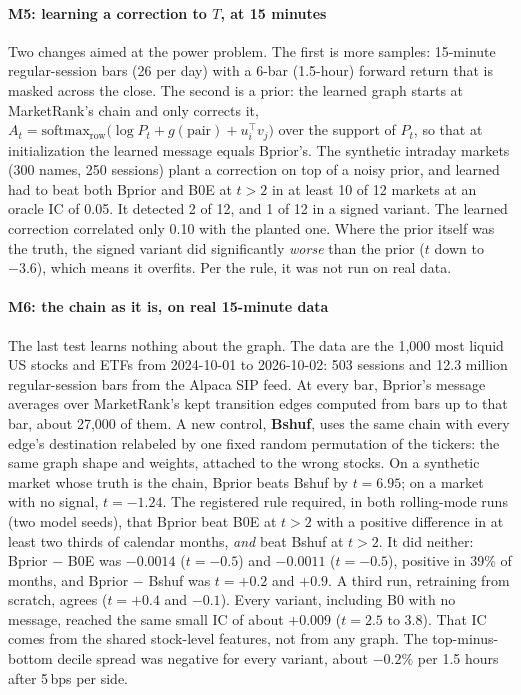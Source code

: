 \documentclass[preprint,3p,twocolumn]{elsarticle}
\newcommand{\MR}{MarketRank}
\begin{document}
\paragraph{M5: learning a correction to $T$, at 15 minutes} Two changes aimed at the power problem. The first is more samples: 15-minute regular-session bars (26 per day) with a 6-bar (1.5-hour) forward return that is masked across the close. The second is a prior: the learned graph starts at \MR's chain and only corrects it, $A_t=\mathrm{softmax}_{\text{row}}\bigl(\log P_t+g(\text{pair})+u_i^\top v_j\bigr)$ over the support of $P_t$, so that at initialization the learned message equals Bprior's. The synthetic intraday markets (300 names, 250 sessions) plant a correction on top of a noisy prior, and learned had to beat both Bprior and B0E at $t>2$ in at least 10 of 12 markets at an oracle IC of 0.05. It detected 2 of 12, and 1 of 12 in a signed variant. The learned correction correlated only 0.10 with the planted one. Where the prior itself was the truth, the signed variant did significantly \emph{worse} than the prior ($t$ down to $-3.6$), which means it overfits. Per the rule, it was not run on real data.

\paragraph{M6: the chain as it is, on real 15-minute data} The last test learns nothing about the graph. The data are the 1,000 most liquid US stocks and ETFs from 2024-10-01 to 2026-10-02: 503 sessions and 12.3 million regular-session bars from the Alpaca SIP feed. At every bar, Bprior's message averages over \MR's kept transition edges computed from bars up to that bar, about 27,000 of them. A new control, \textbf{Bshuf}, uses the same chain with every edge's destination relabeled by one fixed random permutation of the tickers: the same graph shape and weights, attached to the wrong stocks. On a synthetic market whose truth is the chain, Bprior beats Bshuf by $t=6.95$; on a market with no signal, $t=-1.24$. The registered rule required, in both rolling-mode runs (two model seeds), that Bprior beat B0E at $t>2$ with a positive difference in at least two thirds of calendar months, \emph{and} beat Bshuf at $t>2$. It did neither: Bprior $-$ B0E was $-0.0014$ ($t=-0.5$) and $-0.0011$ ($t=-0.5$), positive in 39\% of months, and Bprior $-$ Bshuf was $t=+0.2$ and $+0.9$. A third run, retraining from scratch, agrees ($t=+0.4$ and $-0.1$). Every variant, including B0 with no message, reached the same small IC of about $+0.009$ ($t=2.5$ to $3.8$). That IC comes from the shared stock-level features, not from any graph. The top-minus-bottom decile spread was negative for every variant, about $-0.2\%$ per 1.5 hours after 5\,bps per side.
\end{document}
